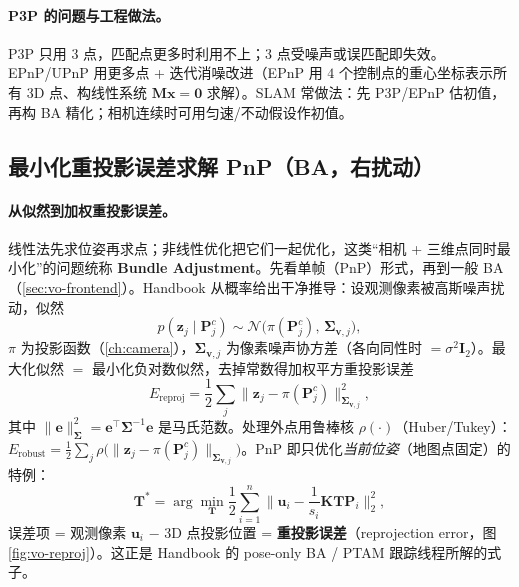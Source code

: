 \paragraph{P3P 的问题与工程做法\cite{gaoxiang2019slam14}。}P3P 只用 $3$ 点，匹配点更多时利用不上；$3$ 点受噪声或误匹配即失效。EPnP/UPnP 用更多点 + 迭代消噪改进（EPnP 用 $4$ 个控制点的重心坐标表示所有 3D 点、构线性系统 $\mathbf{M}\mathbf{x}=\mathbf{0}$ 求解）。SLAM 常做法：先 P3P/EPnP 估初值，再构 BA 精化；相机连续时可用匀速/不动假设作初值。

\subsection{最小化重投影误差求解 PnP（BA，右扰动）}
\label{sec:vo-pnp-ba}

\paragraph{从似然到加权重投影误差。}线性法先求位姿再求点；非线性优化把它们一起优化，这类“相机 + 三维点同时最小化”的问题统称 \textbf{Bundle Adjustment}\cite{carlone2026handbook,gaoxiang2019slam14}。先看单帧（PnP）形式，再到一般 BA（\cref{sec:vo-frontend}）。Handbook\cite{carlone2026handbook} 从概率给出干净推导：设观测像素被高斯噪声扰动，似然
\begin{equation}
  p(\mathbf{z}_j\mid\mathbf{P}_j^c)\sim\mathcal{N}\!\big(\pi(\mathbf{P}_j^c),\,\boldsymbol{\Sigma}_{\mathbf v,j}\big),
  \label{eq:vo-likelihood}
\end{equation}
$\pi$ 为投影函数（\cref{ch:camera}），$\boldsymbol{\Sigma}_{\mathbf v,j}$ 为像素噪声协方差（各向同性时 $=\sigma^2\mathbf{I}_2$）。最大化似然 $=$ 最小化负对数似然，去掉常数得加权平方重投影误差
\begin{equation}
  E_{\text{reproj}}=\frac12\sum_j\big\|\mathbf{z}_j-\pi(\mathbf{P}_j^c)\big\|_{\boldsymbol{\Sigma}_{\mathbf v,j}}^2,
  \label{eq:vo-reproj-cost}
\end{equation}
其中 $\|\mathbf{e}\|_{\boldsymbol{\Sigma}}^2=\mathbf{e}^\top\boldsymbol{\Sigma}^{-1}\mathbf{e}$ 是马氏范数。处理外点用鲁棒核 $\rho(\cdot)$（Huber/Tukey）：$E_{\text{robust}}=\tfrac12\sum_j\rho\big(\|\mathbf{z}_j-\pi(\mathbf{P}_j^c)\|_{\boldsymbol{\Sigma}_{\mathbf v,j}}\big)$。PnP 即只优化\emph{当前位姿}（地图点固定）的特例\cite{carlone2026handbook}：
\begin{equation}
  \mathbf{T}^*=\arg\min_{\mathbf{T}}\frac12\sum_{i=1}^{n}\Big\|\mathbf{u}_i-\frac1{s_i}\mathbf{K}\mathbf{T}\mathbf{P}_i\Big\|_2^2,
  \label{eq:vo-pnp-ba}
\end{equation}
误差项 = 观测像素 $\mathbf{u}_i$ $-$ 3D 点投影位置 = \textbf{重投影误差}（reprojection error，图 \ref{fig:vo-reproj}）。这正是 Handbook 的 pose-only BA / PTAM 跟踪线程所解的式子。

